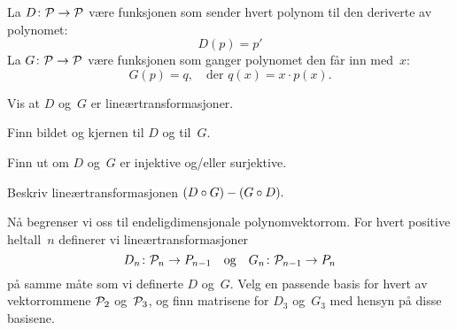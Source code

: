 \begin{oppgave}
La $D \colon \P \to \P$ være funksjonen som sender hvert polynom til
den deriverte av polynomet:
\[
D(p) = p'
\]
La $G \colon \P \to \P$ være funksjonen som ganger polynomet den får
inn med~$x$:
\[
G(p) = q,
\quad\text{der\ \ $q(x) = x \cdot p(x)$.}
\]

\begin{punkt}
Vis at $D$ og~$G$ er lineærtransformasjoner.
\end{punkt}

\begin{punkt}
Finn bildet og kjernen til $D$ og til~$G$.
\end{punkt}

\begin{punkt}
Finn ut om $D$ og~$G$ er injektive og/eller surjektive.
\end{punkt}

\begin{punkt}
Beskriv lineærtransformasjonen
$
(D \fcomp G) - (G \fcomp D).
$
\end{punkt}



\begin{punkt}
Nå begrenser vi oss til endeligdimensjonale polynomvektorrom.  For
hvert positive heltall~$n$ definerer vi lineærtransformasjoner
\[
D_n \colon \P_n \to P_{n-1}
\quad\text{og}\quad
G_n \colon \P_{n-1} \to P_n
\]
på samme måte som vi definerte $D$ og~$G$.  Velg en passende basis for
hvert av vektorrommene $\P_2$ og~$\P_3$, og finn matrisene for $D_3$
og~$G_3$ med hensyn på disse basisene.
\end{punkt}

\end{oppgave}


